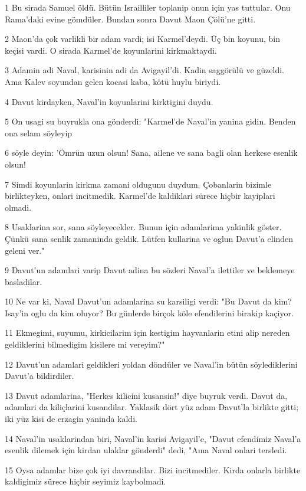 \par 1 Bu sirada Samuel öldü. Bütün Israilliler toplanip onun için yas tuttular. Onu Rama'daki evine gömdüler. Bundan sonra Davut Maon Çölü'ne gitti.
\par 2 Maon'da çok varlikli bir adam vardi; isi Karmel'deydi. Üç bin koyunu, bin keçisi vardi. O sirada Karmel'de koyunlarini kirkmaktaydi.
\par 3 Adamin adi Naval, karisinin adi da Avigayil'di. Kadin saggörülü ve güzeldi. Ama Kalev soyundan gelen kocasi kaba, kötü huylu biriydi.
\par 4 Davut kirdayken, Naval'in koyunlarini kirktigini duydu.
\par 5 On usagi su buyrukla ona gönderdi: "Karmel'de Naval'in yanina gidin. Benden ona selam söyleyip
\par 6 söyle deyin: 'Ömrün uzun olsun! Sana, ailene ve sana bagli olan herkese esenlik olsun!
\par 7 Simdi koyunlarin kirkma zamani oldugunu duydum. Çobanlarin bizimle birlikteyken, onlari incitmedik. Karmel'de kaldiklari sürece hiçbir kayiplari olmadi.
\par 8 Usaklarina sor, sana söyleyecekler. Bunun için adamlarima yakinlik göster. Çünkü sana senlik zamaninda geldik. Lütfen kullarina ve oglun Davut'a elinden geleni ver."
\par 9 Davut'un adamlari varip Davut adina bu sözleri Naval'a ilettiler ve beklemeye basladilar.
\par 10 Ne var ki, Naval Davut'un adamlarina su karsiligi verdi: "Bu Davut da kim? Isay'in oglu da kim oluyor? Bu günlerde birçok köle efendilerini birakip kaçiyor.
\par 11 Ekmegimi, suyumu, kirkicilarim için kestigim hayvanlarin etini alip nereden geldiklerini bilmedigim kisilere mi vereyim?"
\par 12 Davut'un adamlari geldikleri yoldan döndüler ve Naval'in bütün söylediklerini Davut'a bildirdiler.
\par 13 Davut adamlarina, "Herkes kilicini kusansin!" diye buyruk verdi. Davut da, adamlari da kiliçlarini kusandilar. Yaklasik dört yüz adam Davut'la birlikte gitti; iki yüz kisi de erzagin yaninda kaldi.
\par 14 Naval'in usaklarindan biri, Naval'in karisi Avigayil'e, "Davut efendimiz Naval'a esenlik dilemek için kirdan ulaklar gönderdi" dedi, "Ama Naval onlari tersledi.
\par 15 Oysa adamlar bize çok iyi davrandilar. Bizi incitmediler. Kirda onlarla birlikte kaldigimiz sürece hiçbir seyimiz kaybolmadi.
